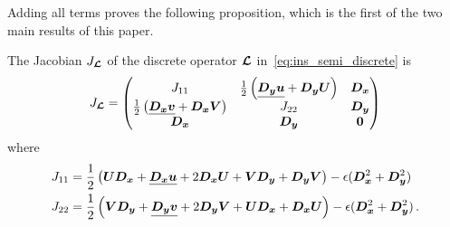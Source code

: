 Adding all terms proves the following proposition, which is the first of the two main results of this paper.

\begin{proposition}
  The Jacobian $J_{\bm{\mathcal{L}}}$ of the discrete operator $\bm{\mathcal{L}}$ in~\eqref{eq:ins_semi_discrete} is
  \begin{equation}
    J_{\euln} =
    \begin{pmatrix}
      J_{11} & \frac{1}{2} \left(\diagn{\Dy\un} + \Dy\Un\right)& \Dx \\
       \frac{1}{2} \left(\diagn{\Dx\vn} + \Dx\Vn\right) & J_{22} & \Dy \\
      \Dx & \Dy & \zeron \\
    \end{pmatrix}
    \label{eq:J_L}
  \end{equation}
  where
  \begin{align*}
    J_{11} &= \frac{1}{2} \left(\bm{U}\bm{D_x} + \underline{\bm{D_x}\bm{u}} + 2\bm{D_x}\bm{U} + \bm{V}\bm{D_y} + \bm{D_y}\bm{V}\right)  - \epsilon (\bm{D_x}^2 + \bm{D_y}^2)\\
    J_{22} &= \frac{1}{2} \left(\bm{V}\bm{D_y} + \underline{\bm{D_y}\bm{v}} + 2\bm{D_y}\bm{V} + \bm{U}\bm{D_x} + \bm{D_x}\bm{U}\right)  - \epsilon (\bm{D_x}^2 + \bm{D_y}^2)
    \, .
  \end{align*}
  \label{prop:ins}
\end{proposition}

